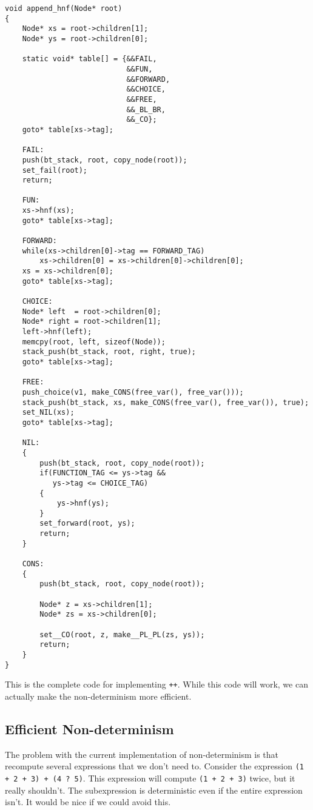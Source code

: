 \documentclass{article}
\begin{document}
\begin{verbatim}
void append_hnf(Node* root)
{
    Node* xs = root->children[1];
    Node* ys = root->children[0];

    static void* table[] = {&&FAIL, 
                            &&FUN, 
                            &&FORWARD, 
                            &&CHOICE, 
                            &&FREE,
                            &&_BL_BR, 
                            &&_CO};
    goto* table[xs->tag];

    FAIL:
    push(bt_stack, root, copy_node(root));
    set_fail(root);
    return;

    FUN:
    xs->hnf(xs);
    goto* table[xs->tag];

    FORWARD:
    while(xs->children[0]->tag == FORWARD_TAG)
        xs->children[0] = xs->children[0]->children[0];
    xs = xs->children[0];
    goto* table[xs->tag];

    CHOICE:
    Node* left  = root->children[0];
    Node* right = root->children[1];
    left->hnf(left);
    memcpy(root, left, sizeof(Node));
    stack_push(bt_stack, root, right, true);
    goto* table[xs->tag];

    FREE:
    push_choice(v1, make_CONS(free_var(), free_var()));
    stack_push(bt_stack, xs, make_CONS(free_var(), free_var()), true);
    set_NIL(xs);
    goto* table[xs->tag];

    NIL:
    {
        push(bt_stack, root, copy_node(root));
        if(FUNCTION_TAG <= ys->tag &&
           ys->tag <= CHOICE_TAG)
        {
            ys->hnf(ys);
        }
        set_forward(root, ys);
        return;
    }

    CONS:
    {
        push(bt_stack, root, copy_node(root));

        Node* z = xs->children[1];
        Node* zs = xs->children[0];

        set__CO(root, z, make__PL_PL(zs, ys));
        return;
    }
}
\end{verbatim}

This is the complete code for implementing \texttt{++}.
While this code will work, we can actually make the non-determinism more efficient.

\subsection{Efficient Non-determinism}

The problem with the current implementation of non-determinism is that recompute several expressions that we don't need to.
Consider the expression \texttt{(1 + 2 + 3) + (4 ? 5)}.
This expression will compute \texttt{(1 + 2 + 3)} twice, but it really shouldn't.
The subexpression is deterministic even if the entire expression isn't.
It would be nice if we could avoid this.
\end{document}
